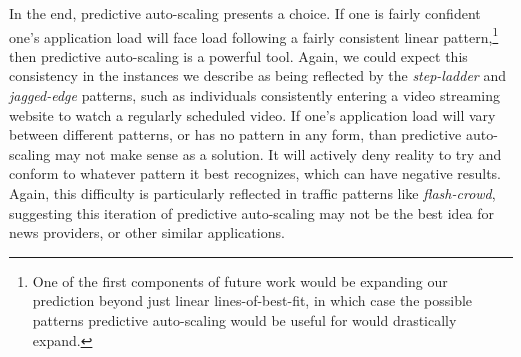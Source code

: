 In the end, predictive auto-scaling presents a choice. If one is fairly
confident one's application load will face load following a fairly consistent
linear pattern,\footnote{One of the first components of future work would
be expanding our prediction beyond just linear lines-of-best-fit, in which case
the possible patterns predictive auto-scaling would be useful for would
drastically expand.} then predictive auto-scaling is a powerful tool. Again, we
could expect this consistency in the instances we describe as being reflected by
the \textit{step-ladder} and \textit{jagged-edge} patterns, such as individuals
consistently entering a video streaming website to watch a regularly scheduled
video. If one's application load will vary between different patterns, or has no
pattern in any form, than predictive auto-scaling may not make sense as a
solution. It will actively deny reality to try and conform to whatever pattern
it best recognizes, which can have negative results. Again, this difficulty is
particularly reflected in traffic patterns like \textit{flash-crowd}, suggesting
this iteration of predictive auto-scaling may not be the best idea for news
providers, or other similar applications.
